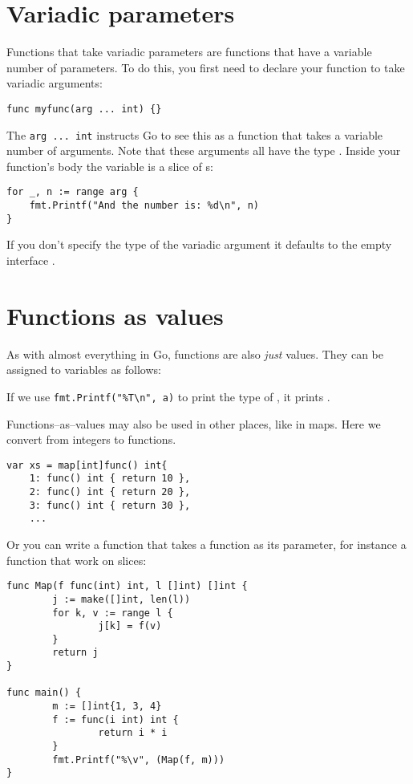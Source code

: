 \section{Variadic parameters}
Functions that take variadic parameters are functions that have a
variable number of parameters. To do this, you first
need to declare your function to take variadic arguments:
\begin{lstlisting}[caption=Variadac parameters]
func myfunc(arg ... int) {}
\end{lstlisting}
The \lstinline{arg ... int} instructs Go to see this as a function that
takes a variable number of arguments. Note that these arguments all
have the type . Inside your function's body the variable
 is a slice of s:
\begin{lstlisting}
for _, n := range arg {
    fmt.Printf("And the number is: %d\n", n)
}
\end{lstlisting}

If you don't specify the type of the variadic argument it defaults to the
empty interface .

\section{Functions as values}
\label{sec:functions as values}
As with almost everything in Go, functions are also \emph{just} values.
They can be assigned to variables as follows:

If we use \lstinline{fmt.Printf("%T\n", a)} to print the type of
, it prints .

Functions--as--values may also be used in other places, like in maps.
Here we convert from integers to functions.
\begin{lstlisting}[caption=Function as values in maps]
var xs = map[int]func() int{
    1: func() int { return 10 },
    2: func() int { return 20 },
    3: func() int { return 30 },
    ...
\end{lstlisting}
Or you can write a function that takes a function as its parameter, for
instance a  function that work on  slices:
\begin{lstlisting}[caption=A \func{Map} function]
func Map(f func(int) int, l []int) []int {
        j := make([]int, len(l))
        for k, v := range l {
                j[k] = f(v)
        }
        return j
}

func main() {
        m := []int{1, 3, 4}
        f := func(i int) int {
                return i * i
        }
        fmt.Printf("%\v", (Map(f, m)))
}
\end{lstlisting}

